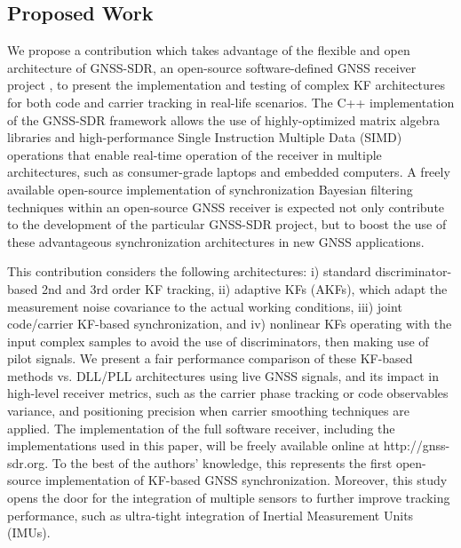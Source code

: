 \subsection{Proposed Work}


We propose a contribution which takes advantage of the flexible and open architecture of GNSS-SDR, an open-source software-defined GNSS receiver project \cite{GNSS-SDR11}, to present the implementation and testing of complex KF architectures for both code and carrier tracking in real-life scenarios. The C++ implementation of the GNSS-SDR framework allows the use of highly-optimized matrix algebra libraries and high-performance Single Instruction Multiple Data (SIMD) operations that enable real-time operation of the receiver in multiple architectures, such as consumer-grade laptops and embedded computers. A freely available open-source implementation of synchronization Bayesian filtering techniques within an open-source GNSS receiver is expected not only contribute to the development of the particular GNSS-SDR project, but to boost the use of these advantageous synchronization architectures in new GNSS applications.

This contribution considers the following architectures: i) standard discriminator-based 2nd and 3rd order KF tracking, ii) adaptive KFs (AKFs), which adapt the measurement noise covariance to the actual working conditions, iii) joint code/carrier KF-based synchronization, and iv) nonlinear KFs operating with the input complex samples to avoid the use of discriminators, then making use of pilot signals. We present a fair performance comparison of these KF-based methods vs. DLL/PLL architectures using live GNSS signals, and its impact in high-level receiver metrics, such as the carrier phase tracking or code observables variance, and positioning precision when carrier smoothing techniques are applied. The implementation of the full software receiver, including the implementations used in this paper, will be freely available online at http://gnss-sdr.org. To the best of the authors' knowledge, this represents the first open-source implementation of KF-based GNSS synchronization. Moreover, this study opens the door for the integration of multiple sensors to further improve tracking performance, such as ultra-tight integration of Inertial Measurement Units (IMUs).